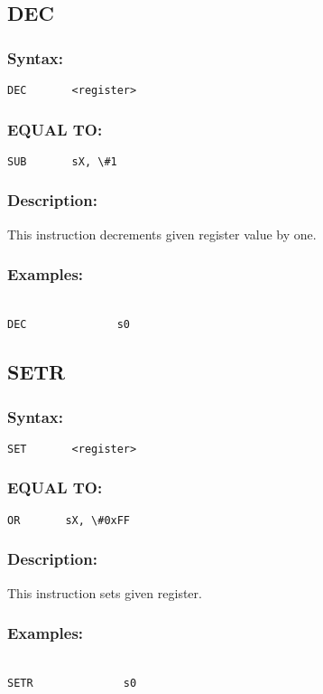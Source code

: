 {    \subsection{DEC}
        \subsubsection{Syntax:}
            \verb'DEC       <register>'

        \subsubsection{EQUAL TO:}
            \verb'SUB       sX, \#1'

        \subsubsection{Description:}
    This instruction decrements given register value by one.
        \subsubsection{Examples:}
        {
            ~\\
            \usecodefont
            \verb'DEC              s0'\\
        }

    \subsection{SETR}
        \subsubsection{Syntax:}
            \verb'SET       <register>'

        \subsubsection{EQUAL TO:}
            \verb'OR       sX, \#0xFF'

        \subsubsection{Description:}
            This instruction sets given register.

        \subsubsection{Examples:}
        {
            ~\\
            \usecodefont
            \verb'SETR              s0'\\
        }

}
